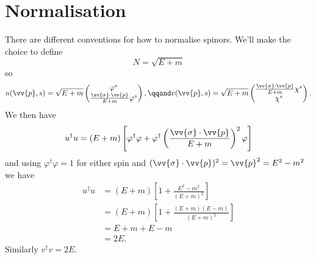 \documentclass[fleqn]{NotesClass}
\newcommand{\hermit}{{\dagger}}
\begin{document}
    \section{Normalisation}
    There are different conventions for how to normalise spinors.
    We'll make the choice to define
    \begin{equation}
        N = \sqrt{E + m}
    \end{equation}
    so
    \begin{equation}
        u(\vv{p}, s) = \sqrt{E + m}
        \begin{pmatrix}
            \varphi^s\\ \frac{\vv{\sigma} \cdot \vv{p}}{E + m}\varphi^s
        \end{pmatrix}
        , \qqand v(\vv{p}, s) = \sqrt{E + m}
        \begin{pmatrix}
            \frac{\vv{\sigma} \cdot \vv{p}}{E + m}\chi^s\\ \chi^s
        \end{pmatrix}
        .
    \end{equation}
    We then have
    \begin{equation}
        u^\hermit u = (E + m)\left[ \varphi^\hermit \varphi + \varphi^\hermit \left( \frac{\vv{\sigma} \cdot \vv{p}}{E + m} \right)^2 \varphi \right]
    \end{equation}
    and using \(\varphi^\hermit \varphi = 1\) for either spin and \((\vv{\sigma} \cdot \vv{p})^2 = \vv{p}^2 = E^2 - m^2\) we have
    \begin{align}
        u^\hermit u &= (E + m)\left[ 1 + \frac{E^2 - m^2}{(E + m)^2} \right]\\
        &= (E + m)\left[ 1 + \frac{(E + m)(E - m)}{(E + m)^2} \right]\\
        &= E + m + E - m\\
        &= 2E.
    \end{align}
    Similarly \(v^\hermit v = 2E\).
    
\end{document}
